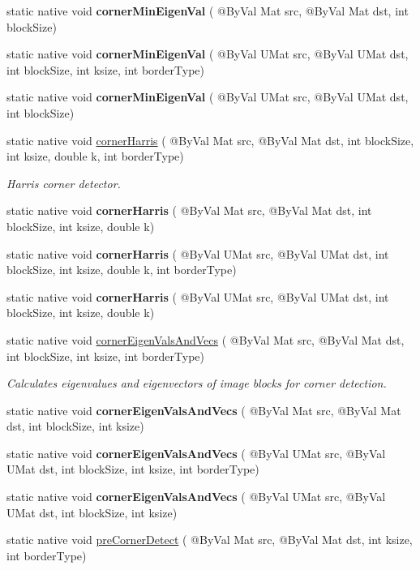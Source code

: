 \begin{DoxyCompactItemize}
static native void {\bfseries corner\+Min\+Eigen\+Val} ( @By\+Val Mat src, @By\+Val Mat dst, int block\+Size)
\item 
static native void {\bfseries corner\+Min\+Eigen\+Val} ( @By\+Val U\+Mat src, @By\+Val U\+Mat dst, int block\+Size, int ksize, int border\+Type)
\item 
static native void {\bfseries corner\+Min\+Eigen\+Val} ( @By\+Val U\+Mat src, @By\+Val U\+Mat dst, int block\+Size)
\item 
static native void \hyperlink{group__imgproc__feature_ga33bee1c8b89d7d1963fe5212170ab77b}{corner\+Harris} ( @By\+Val Mat src, @By\+Val Mat dst, int block\+Size, int ksize, double k, int border\+Type)
\begin{DoxyCompactList}\small\item\em Harris corner detector. \end{DoxyCompactList}\item 
static native void {\bfseries corner\+Harris} ( @By\+Val Mat src, @By\+Val Mat dst, int block\+Size, int ksize, double k)
\item 
static native void {\bfseries corner\+Harris} ( @By\+Val U\+Mat src, @By\+Val U\+Mat dst, int block\+Size, int ksize, double k, int border\+Type)
\item 
static native void {\bfseries corner\+Harris} ( @By\+Val U\+Mat src, @By\+Val U\+Mat dst, int block\+Size, int ksize, double k)
\item 
static native void \hyperlink{group__imgproc__feature_gaf0aa40bf8a841f8e468c41bb2d2583b4}{corner\+Eigen\+Vals\+And\+Vecs} ( @By\+Val Mat src, @By\+Val Mat dst, int block\+Size, int ksize, int border\+Type)
\begin{DoxyCompactList}\small\item\em Calculates eigenvalues and eigenvectors of image blocks for corner detection. \end{DoxyCompactList}\item 
static native void {\bfseries corner\+Eigen\+Vals\+And\+Vecs} ( @By\+Val Mat src, @By\+Val Mat dst, int block\+Size, int ksize)
\item 
static native void {\bfseries corner\+Eigen\+Vals\+And\+Vecs} ( @By\+Val U\+Mat src, @By\+Val U\+Mat dst, int block\+Size, int ksize, int border\+Type)
\item 
static native void {\bfseries corner\+Eigen\+Vals\+And\+Vecs} ( @By\+Val U\+Mat src, @By\+Val U\+Mat dst, int block\+Size, int ksize)
\item 
static native void \hyperlink{group__imgproc__feature_ga1c51e6cab3684b202f45967edc555f5c}{pre\+Corner\+Detect} ( @By\+Val Mat src, @By\+Val Mat dst, int ksize, int border\+Type)

\end{DoxyCompactItemize}
